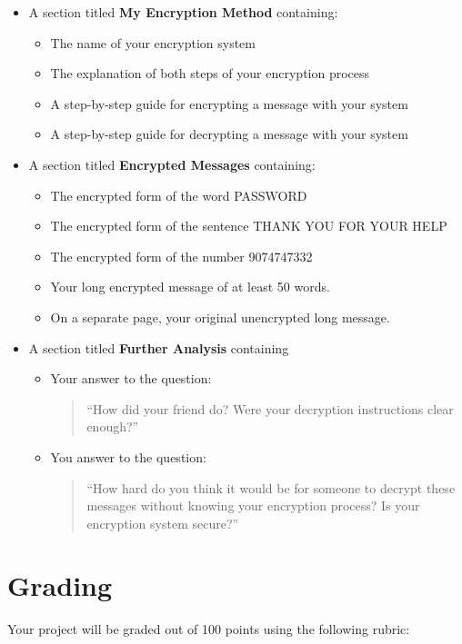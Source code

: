 \begin{itemize}
\item A section titled {\bf My Encryption Method} containing:
  \begin{itemize}
  \item The name of your encryption system
  \item The explanation of both steps of your encryption process
  \item A step-by-step guide for encrypting a message with your
    system
  \item A step-by-step guide for decrypting a message with your
    system
  \end{itemize}
\item A section titled {\bf Encrypted Messages} containing:
  \begin{itemize}
  \item The encrypted form of the word PASSWORD
  \item The encrypted form of the sentence THANK YOU FOR YOUR HELP
  \item The encrypted form of the number 9074747332
  \item Your long encrypted message of at least 50 words.
  \item On a separate page, your original unencrypted long message.  \end{itemize}
\item A section titled {\bf Further Analysis} containing 
  \begin{itemize}
  \item Your answer to the question: \begin{quote}``How did your friend do? Were your
    decryption instructions clear enough?''\end{quote}
  \item You answer to the question: \begin{quote} ``How hard do you think it would be
    for someone to
    decrypt these messages without knowing your encryption process? Is
    your
    encryption system secure?''\end{quote}
  \end{itemize}
\end{itemize}

\section{Grading}

Your project will be graded out of 100 points using the following rubric:

